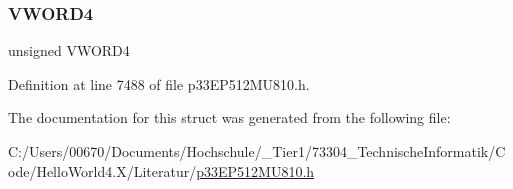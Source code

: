 \subsubsection{\texorpdfstring{V\+W\+O\+R\+D4}{VWORD4}}
{\footnotesize\ttfamily unsigned V\+W\+O\+R\+D4}



Definition at line 7488 of file p33\+E\+P512\+M\+U810.\+h.



The documentation for this struct was generated from the following file\+:\begin{DoxyCompactItemize}
\item 
C\+:/\+Users/00670/\+Documents/\+Hochschule/\+\_\+\+Tier1/73304\+\_\+\+Technische\+Informatik/\+Code/\+Hello\+World4.\+X/\+Literatur/\hyperlink{p33_e_p512_m_u810_8h}{p33\+E\+P512\+M\+U810.\+h}\end{DoxyCompactItemize}
